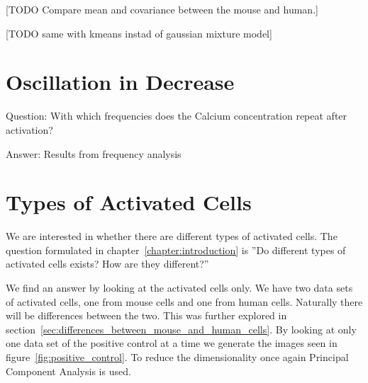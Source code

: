 [TODO Compare mean and covariance between the mouse and human.]

[TODO same with kmeans instad of gaussian mixture model]


\section{Oscillation in Decrease}

Question: With which frequencies does the Calcium concentration repeat after activation?

Answer: Results from frequency analysis

\section{Types of Activated Cells}

We are interested in whether there are different types of activated cells. The question formulated in chapter~\ref{chapter:introduction} is ''Do different types of activated cells exists? How are they different?''

We find an answer by looking at the activated cells only. We have two data sets of activated cells, one from mouse cells and one from human cells. Naturally there will be differences between the two. This was further explored in section~\ref{sec:differences_between_mouse_and_human_cells}. By looking at only one data set of the positive control at a time we generate the images seen in figure~\ref{fig:positive_control}. To reduce the dimensionality once again Principal Component Analysis is used.

